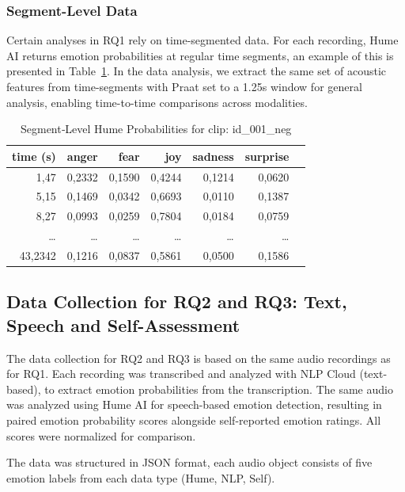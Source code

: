 \subsubsection{Segment-Level Data}
Certain analyses in RQ1 rely on time-segmented data. For each recording, Hume AI returns emotion probabilities at regular time segments, an example of this is presented in Table~\ref{tab:segments_hume_example}. 
In the data analysis, we extract the same set of acoustic features from time-segments with Praat set to a 1.25s window for general analysis, enabling time-to-time comparisons across modalities.
\begin{table}[H]
    \centering
    
    \begin{tabular}{rrrrrrl}
      \toprule
      \textbf{time (s)} & \textbf{anger} & \textbf{fear} & \textbf{joy} & \textbf{sadness} & \textbf{surprise} \\
      \midrule
      1,47    & 0,2332  & 0,1590 & 0,4244 & 0,1214 & 0,0620 \\
      5,15    & 0,1469  & 0,0342 & 0,6693 & 0,0110 & 0,1387 \\
      8,27    & 0,0993  & 0,0259 & 0,7804 & 0,0184 & 0,0759 \\
      \dots   & \dots   & \dots  & \dots  & \dots  & \dots  \\
      43,2342 & 0,1216  & 0,0837 & 0,5861 & 0,0500 & 0,1586 \\
      \bottomrule
    \end{tabular}
    \caption{Segment‐Level Hume Probabilities for clip: id\_001\_neg}
    \label{tab:segments_hume_example}
  \end{table}
  

\subsection{Data Collection for RQ2 and RQ3: Text, Speech and Self-Assessment}
\label{sec:datacoll_rq2_rq3}


The data collection for RQ2 and RQ3 is based on the same audio recordings as for RQ1. 
Each recording was transcribed and analyzed with NLP Cloud (text-based), to extract emotion probabilities from the transcription. The same audio was analyzed using Hume AI for speech-based emotion detection, resulting in paired emotion probability scores alongside self-reported emotion ratings. All scores were normalized for comparison.

The data was structured in JSON format, each audio object consists of five emotion labels from each data type (Hume, NLP, Self). 


